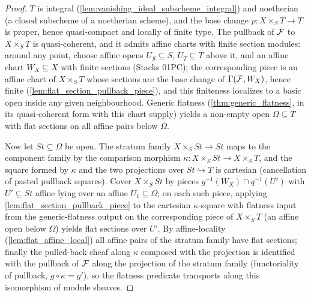 \begin{proof}
  \leanok
  \(T\) is integral (\cref{lem:vanishing_ideal_subscheme_integral}) and
  noetherian (a closed subscheme of a noetherian scheme), and the base
  change \(p : X \times_S T \to T\) is proper, hence quasi-compact and
  locally of finite type.  The pullback of \(\mathcal{F}\) to \(X \times_S T\) is
  quasi-coherent, and it admits affine charts with finite section modules:
  around any point, choose affine opens \(U_S \subseteq S\),
  \(U_T \subseteq T\) above it, and an affine chart \(W_X \subseteq X\)
  with finite sections (Stacks 01PC); the corresponding piece is an affine
  chart of \(X \times_S T\) whose sections are the base change of
  \(\Gamma(\mathcal{F}, W_X)\), hence finite (\cref{lem:flat_section_pullback_piece}),
  and this finiteness localizes to a basic open inside any given
  neighbourhood.  Generic flatness (\cref{thm:generic_flatness}, in its
  quasi-coherent form with this chart supply) yields a non-empty open
  \(\Omega \subseteq T\) with flat sections on all affine pairs below
  \(\Omega\).

  Now let \(\mathit{St} \subseteq \Omega\) be open.  The stratum family
  \(X \times_S \mathit{St} \to \mathit{St}\) maps to the component family by
  the comparison morphism
  \(\kappa : X \times_S \mathit{St} \to X \times_S T\), and the square
  formed by \(\kappa\) and the two projections over
  \(\mathit{St} \hookrightarrow T\) is cartesian (cancellation of pasted
  pullback squares).  Cover \(X \times_S \mathit{St}\) by pieces
  \(g^{-1}(W_X) \cap q^{-1}(U')\) with \(U' \subseteq \mathit{St}\) affine
  lying over an affine \(U_1 \subseteq \Omega\); on each such piece,
  applying \cref{lem:flat_section_pullback_piece} to the cartesian
  \(\kappa\)-square with flatness input from the generic-flatness output on
  the corresponding piece of \(X \times_S T\) (an affine open below
  \(\Omega\)) yields flat sections over \(U'\).  By affine-locality
  (\cref{lem:flat_affine_local}) all affine pairs of the stratum family
  have flat sections; finally the pulled-back sheaf along \(\kappa\)
  composed with the projection is identified with the pullback of \(\mathcal{F}\)
  along the projection of the stratum family (functoriality of pullback,
  \(g \circ \kappa = g'\)), so the flatness predicate transports along this
  isomorphism of module sheaves.
\end{proof}

